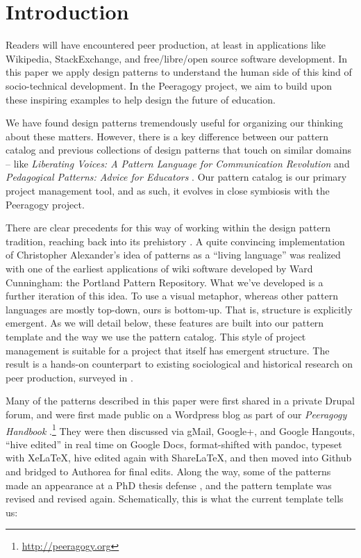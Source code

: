 \section{Introduction}\label{sec:Introduction}

Readers will have encountered peer production, at least in applications like Wikipedia, StackExchange, and free/libre/open source software development.  In this paper we apply design patterns to understand the human side of this kind of socio-technical development.  In the Peeragogy project,  we aim to build upon these inspiring examples to help design the future of education.  

We have found design patterns tremendously useful for organizing our thinking about these matters.  However, there is a key difference between our pattern catalog and previous collections of design patterns that touch on similar domains -- like \emph{Liberating Voices: A Pattern Language for Communication Revolution} \cite{schuler2008liberating} and \emph{Pedagogical Patterns: Advice for Educators} \cite{bergin2012pedagogical}.  Our pattern catalog is our primary project management tool, and as such, it evolves in close symbiosis with the Peeragogy project.

There are clear precedents for this way of working within the design pattern tradition, reaching back into its prehistory \cite{alexander1964notes}.  A quite convincing implementation of Christopher Alexander’s idea of patterns as a ``living language'' \cite[p.~xvii]{alexander1977pattern} was realized with one of the earliest applications of wiki software developed by Ward Cunningham: the Portland Pattern Repository. What we've developed is a further iteration of this idea. To use a visual metaphor, whereas other pattern languages are mostly top-down, ours is bottom-up.  That is, structure is explicitly emergent.  As we will detail below, these features are built into our pattern template and the way we use the pattern catalog.  This style of project management is suitable for a project that itself has emergent structure.  The result is a hands-on counterpart to existing sociological and historical research on peer production, surveyed in \cite{benkler2015peer}.

Many of the patterns described in this paper were first shared in a private Drupal forum, and were first made public on a Wordpress blog as part of our \emph{Peeragogy Handbook} \cite{peeragogy-handbook}.\footnote{\url{http://peeragogy.org}}  They were then discussed via gMail, Google+, and Google Hangouts, ``hive edited'' in real time on Google Docs, format-shifted with pandoc, typeset with XeLaTeX, hive edited again with ShareLaTeX, and then moved into Github and bridged to Authorea for final edits.  Along the way, some of the patterns made an appearance at a PhD thesis defense \cite{corneli-thesis}, and the pattern template was revised and revised again.  Schematically, this is what the current template tells us:

